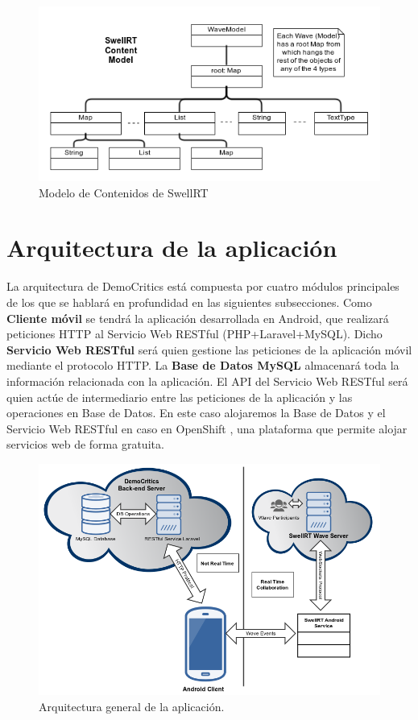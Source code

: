 	
	\begin{figure}[H]
	  \centering
	    \includegraphics[keepaspectratio, scale=0.6]{Media/Captures/waveDataModel.png}
	  \caption{Modelo de Contenidos de SwellRT}
	  \label{fig:wave_swellRT}
	\end{figure}

\section{Arquitectura de la aplicación}

La arquitectura de DemoCritics está compuesta por cuatro módulos principales de los que se hablará en profundidad en las siguientes subsecciones. Como \textbf{Cliente móvil} se tendrá la aplicación desarrollada en Android, que realizará peticiones HTTP al Servicio Web RESTful (PHP+Laravel+MySQL). Dicho \textbf{Servicio Web RESTful} será quien gestione las peticiones de la aplicación móvil mediante el protocolo HTTP. La \textbf{Base de Datos MySQL} almacenará toda la información relacionada con la aplicación. El API del Servicio Web RESTful será quien actúe de intermediario entre las peticiones de la aplicación y las operaciones en Base de Datos. En este caso alojaremos la Base de Datos y el Servicio Web RESTful en caso en OpenShift \cite{ref:OpenShift}, una plataforma que permite alojar servicios web de forma gratuita.

\begin{figure}[H]
\centering
\includegraphics[keepaspectratio, scale=0.55]{Media/Diagrams/generalArchitectureDiagram.png}
\caption{Arquitectura general de la aplicación.}
\label{fig:architecture}
\end{figure}

